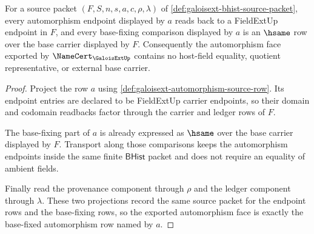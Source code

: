 \begin{theorem}
\label{thm:galoisext-base-fixed-automorphism-readback}
For a source packet $(F,S,n,s,a,c,\rho,\lambda)$ of
\autoref{def:galoisext-bhist-source-packet}, every automorphism endpoint
displayed by $a$ reads back to a FieldExtUp endpoint in $F$, and every
base-fixing comparison displayed by $a$ is an $\hsame$ row over the base
carrier displayed by $F$. Consequently the automorphism face exported by
$\NameCert_{\GaloisExtUp}$ contains no host-field equality, quotient
representative, or external base carrier.
\end{theorem}
\begin{proof}
Project the row $a$ using
\autoref{def:galoisext-automorphism-source-row}. Its endpoint entries are
declared to be FieldExtUp carrier endpoints, so their domain and codomain
readbacks factor through the carrier and ledger rows of $F$.

The base-fixing part of $a$ is already expressed as $\hsame$ over the base
carrier displayed by $F$. Transport along those comparisons keeps the
automorphism endpoints inside the same finite $\mathsf{BHist}$ packet and
does not require an equality of ambient fields.

Finally read the provenance component through $\rho$ and the ledger component
through $\lambda$. These two projections record the same source packet for the
endpoint rows and the base-fixing rows, so the exported automorphism face is
exactly the base-fixed automorphism row named by $a$.
\end{proof}

